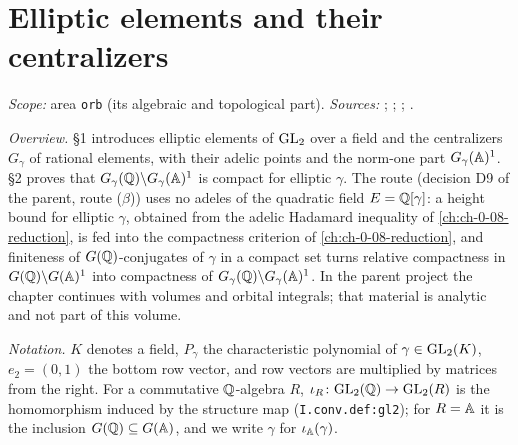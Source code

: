 
\chapter{Elliptic elements and their centralizers}\label{ch:ch-04-orbital}

\noindent\emph{Scope:} area \texttt{orb} (its algebraic and topological part). \emph{Sources:} \cite[§8]{A-I}; \cite[§§10--11]{AIntro};
\cite[Lecture II §§1--2]{Gel}; \cite[§16]{JL}.

\noindent\emph{Overview.} §1 introduces elliptic elements of $\mathrm{GL}_2$ over a field and the centralizers $G_\gamma$ of rational
elements, with their adelic points and the norm-one part $G_\gamma(\mathbb{A})^1$. §2 proves that $G_\gamma(\mathbb{Q})\backslash G_\gamma(\mathbb{A})^1$ is
compact for elliptic $\gamma$. The route (decision D9 of the parent, route ($\beta$)) uses no adeles of the quadratic field $E=\mathbb{Q}[\gamma]$:
a height bound for elliptic $\gamma$, obtained from the adelic Hadamard inequality of \cref{ch:ch-0-08-reduction}, is fed into the compactness
criterion of \cref{ch:ch-0-08-reduction}, and finiteness of $G(\mathbb{Q})$-conjugates of $\gamma$ in a compact set turns relative compactness in
$G(\mathbb{Q})\backslash G(\mathbb{A})^1$ into compactness of $G_\gamma(\mathbb{Q})\backslash G_\gamma(\mathbb{A})^1$. In the parent project the chapter continues with
volumes and orbital integrals; that material is analytic and not part of this volume.

\noindent\emph{Notation.} $K$ denotes a field, $P_\gamma$ the characteristic polynomial of $\gamma\in\mathrm{GL}_2(K)$, $e_2=(0,1)$ the bottom
row vector, and row vectors are multiplied by matrices from the right. For a commutative $\mathbb{Q}$-algebra $R$, $\iota_R\colon\mathrm{GL}_2(\mathbb{Q})\to\mathrm{GL}_2(R)$
is the homomorphism induced by the structure map (\texttt{I.conv.def:gl2}); for $R=\mathbb{A}$ it is the inclusion $G(\mathbb{Q})\subseteq G(\mathbb{A})$, and we write
$\gamma$ for $\iota_{\mathbb{A}}(\gamma)$.

